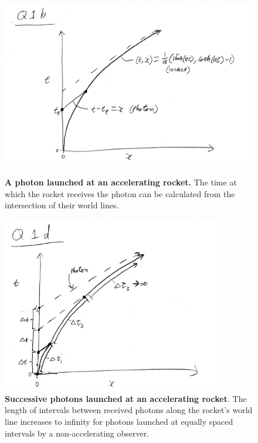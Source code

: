 \documentclass[a4paper]{article}
\begin{document}
\begin{figure}[H]
	{ \centering
		 \includegraphics[width=\textwidth]{Figures/1b}
		 \caption{\textbf{A photon launched at an accelerating rocket.} The time at which the rocket receives the photon can be calculated from the intersection of their world lines.}
	 \label{fig:1}}
	 {\centering
		 \includegraphics[width=0.85\textwidth]{Figures/1d}
		 \caption{\textbf{Successive photons launched at an accelerating rocket}. The length of intervals between received photons along the rocket's world line increases to infinity for photons launched at equally spaced intervals by a  non-accelerating observer. }
	 \label{fig:2}}
 \end{figure}
\end{document}
